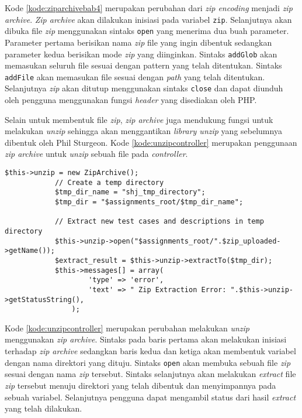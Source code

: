 Kode \ref{kode:ziparchivebab4} merupakan perubahan dari \textit{zip encoding} menjadi \textit{zip archive}. \textit{Zip archive} akan dilakukan inisiasi pada variabel \texttt{zip}. Selanjutnya akan dibuka file \textit{zip} menggunakan sintaks \texttt{open} yang menerima dua buah parameter. Parameter pertama berisikan nama \textit{zip} file yang ingin dibentuk sedangkan parameter kedua berisikan mode \textit{zip} yang diinginkan. Sintaks \texttt{addGlob} akan memasukan seluruh file sesuai dengan pattern yang telah ditentukan. Sintaks \texttt{addFile} akan memasukan file sesuai dengan \textit{path} yang telah ditentukan. Selanjutnya \textit{zip} akan ditutup menggunakan sintaks \texttt{close} dan dapat diunduh oleh pengguna menggunakan fungsi \textit{header} yang disediakan oleh PHP.


Selain untuk membentuk file \textit{zip}, \textit{zip archive} juga mendukung fungsi untuk melakukan \textit{unzip} sehingga akan menggantikan \textit{library unzip} yang sebelumnya dibentuk oleh Phil Sturgeon. Kode \ref{kode:unzipcontroller} merupakan penggunaan \textit{zip archive} untuk \textit{unzip} sebuah file pada \textit{controller}.

\begin{lstlisting}[caption=Perancangan perubahan \textit{unzip} menggunakan \textit{zip archive} pada \textit{controller}, label=kode:unzipcontroller]
$this->unzip = new ZipArchive();
			// Create a temp directory
			$tmp_dir_name = "shj_tmp_directory";
			$tmp_dir = "$assignments_root/$tmp_dir_name";

			// Extract new test cases and descriptions in temp directory
			$this->unzip->open("$assignments_root/".$zip_uploaded->getName());
			$extract_result = $this->unzip->extractTo($tmp_dir);
			$this->messages[] = array(
					'type' => 'error',
					'text' => " Zip Extraction Error: ".$this->unzip->getStatusString(),
				);
\end{lstlisting}

Kode \ref{kode:unzipcontroller} merupakan perubahan melakukan \textit{unzip} menggunakan \textit{zip archive}. Sintaks pada baris pertama akan melakukan inisiasi terhadap \textit{zip archive} sedangkan baris kedua dan ketiga akan membentuk variabel dengan nama direktori yang dituju. Sintaks \texttt{open} akan membuka sebuah file \textit{zip} sesuai dengan nama \textit{zip} tersebut. Sintaks selanjutnya akan melakukan \textit{extract} file \textit{zip} tersebut menuju direktori yang telah dibentuk dan menyimpannya pada sebuah variabel. Selanjutnya pengguna dapat mengambil status dari hasil \textit{extract} yang telah dilakukan. 

